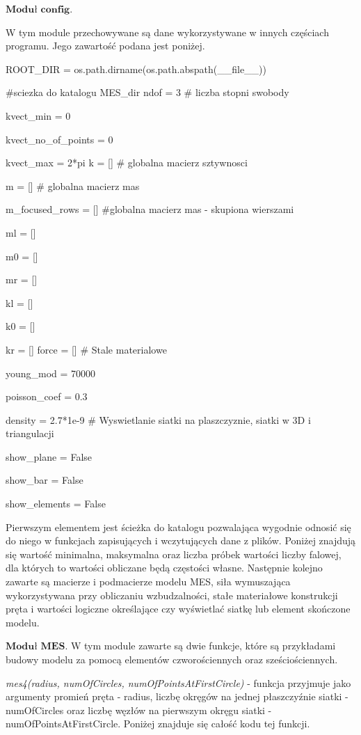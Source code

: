  \( \textbf{Moduł config} \).

W tym module przechowywane są dane wykorzystywane w innych częściach programu. Jego zawartość podana jest poniżej.

\vspace {3mm}
ROOT\_DIR = os.path.dirname(os.path.abspath(\_\_file\_\_))

\#sciezka do katalogu MES\_dir
\vspace {3mm}
ndof = 3    \# liczba stopni swobody

kvect\_min = 0

kvect\_no\_of\_points = 0

kvect\_max = 2*pi
\vspace {3mm}
k = []  \# globalna macierz sztywnosci

m = []  \# globalna macierz mas

m\_focused\_rows = [] \#globalna macierz mas - skupiona wierszami

ml = []

m0 = []

mr = []

kl = []

k0 = []

kr = []
\vspace {3mm}
force = []
\vspace {3mm}
\# Stale materialowe

young\_mod = 70000

poisson\_coef = 0.3

density = 2.7*1e-9
\vspace {3mm}
\# Wyswietlanie siatki na plaszczyznie, siatki w 3D i triangulacji

show\_plane = False

show\_bar = False

show\_elements = False
\vspace {3mm}

Pierwszym elementem jest ścieżka do katalogu pozwalająca wygodnie odnosić się do niego w funkcjach zapisujących i wczytujących dane z plików. Poniżej znajdują się wartość minimalna, maksymalna oraz liczba próbek wartości liczby falowej, dla których to wartości obliczane będą częstości własne. Następnie kolejno zawarte są macierze i podmacierze modelu MES, siła wymuszająca wykorzystywana przy obliczaniu wzbudzalności, stałe materiałowe konstrukcji pręta i wartości logiczne określające czy wyświetlać siatkę lub element skończone modelu.

\vspace {3mm}

 \( \textbf{Moduł MES} \).
W tym module zawarte są dwie funkcje, które są przykładami budowy modelu za pomocą elementów czworościennych oraz sześciościennych.

\textit{mes4(radius, numOfCircles, numOfPointsAtFirstCircle)} - funkcja przyjmuje jako argumenty promień pręta - radius, liczbę okręgów na jednej płaszczyźnie siatki - numOfCircles oraz liczbę węzłów na pierwszym okręgu siatki - numOfPointsAtFirstCircle. Poniżej znajduje się całość kodu tej funkcji.

